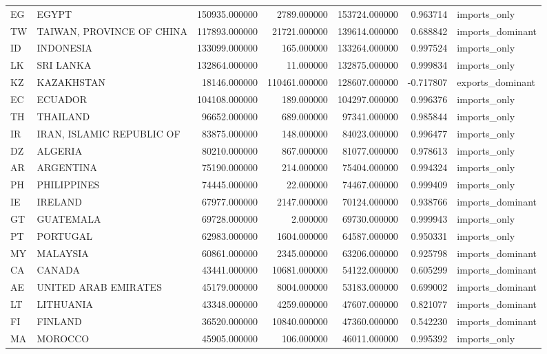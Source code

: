 \begin{tabular}{llrrrrl}
EG & EGYPT & 150935.000000 & 2789.000000 & 153724.000000 & 0.963714 & imports\_only \\
TW & TAIWAN, PROVINCE OF CHINA & 117893.000000 & 21721.000000 & 139614.000000 & 0.688842 & imports\_dominant \\
ID & INDONESIA & 133099.000000 & 165.000000 & 133264.000000 & 0.997524 & imports\_only \\
LK & SRI LANKA & 132864.000000 & 11.000000 & 132875.000000 & 0.999834 & imports\_only \\
KZ & KAZAKHSTAN & 18146.000000 & 110461.000000 & 128607.000000 & -0.717807 & exports\_dominant \\
EC & ECUADOR & 104108.000000 & 189.000000 & 104297.000000 & 0.996376 & imports\_only \\
TH & THAILAND & 96652.000000 & 689.000000 & 97341.000000 & 0.985844 & imports\_only \\
IR & IRAN, ISLAMIC REPUBLIC OF & 83875.000000 & 148.000000 & 84023.000000 & 0.996477 & imports\_only \\
DZ & ALGERIA & 80210.000000 & 867.000000 & 81077.000000 & 0.978613 & imports\_only \\
AR & ARGENTINA & 75190.000000 & 214.000000 & 75404.000000 & 0.994324 & imports\_only \\
PH & PHILIPPINES & 74445.000000 & 22.000000 & 74467.000000 & 0.999409 & imports\_only \\
IE & IRELAND & 67977.000000 & 2147.000000 & 70124.000000 & 0.938766 & imports\_dominant \\
GT & GUATEMALA & 69728.000000 & 2.000000 & 69730.000000 & 0.999943 & imports\_only \\
PT & PORTUGAL & 62983.000000 & 1604.000000 & 64587.000000 & 0.950331 & imports\_only \\
MY & MALAYSIA & 60861.000000 & 2345.000000 & 63206.000000 & 0.925798 & imports\_dominant \\
CA & CANADA & 43441.000000 & 10681.000000 & 54122.000000 & 0.605299 & imports\_dominant \\
AE & UNITED ARAB EMIRATES & 45179.000000 & 8004.000000 & 53183.000000 & 0.699002 & imports\_dominant \\
LT & LITHUANIA & 43348.000000 & 4259.000000 & 47607.000000 & 0.821077 & imports\_dominant \\
FI & FINLAND & 36520.000000 & 10840.000000 & 47360.000000 & 0.542230 & imports\_dominant \\
MA & MOROCCO & 45905.000000 & 106.000000 & 46011.000000 & 0.995392 & imports\_only \\

\end{tabular}

